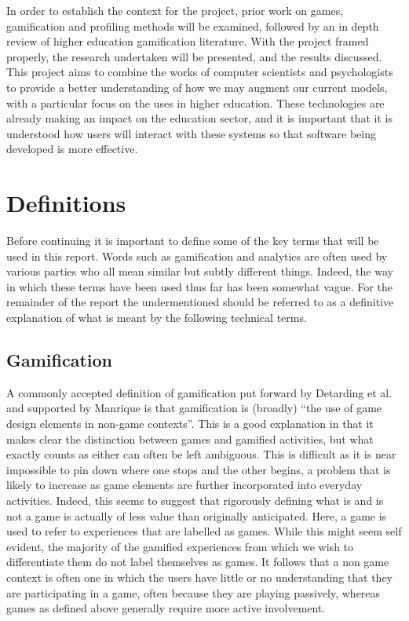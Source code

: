 \documentclass[12pt,a4paper,twoside]{report}
\begin{document}
In order to establish the context for the project, prior work on games, gamification and profiling methods will be examined, followed by an in depth review of higher education gamification literature. With the project framed properly, the research undertaken will be presented, and the results discussed. This project aims to combine the works of computer scientists and psychologists to provide a better understanding of how we may augment our current models, with a particular focus on the uses in higher education. These technologies are already making an impact on the education sector, and it is important that it is understood how users will interact with these systems so that software being developed is more effective.

\chapter{Definitions}
\label{sec:define}
Before continuing it is important to define some of the key terms that will be used in this report. Words such as gamification and analytics are often used by various parties who all mean similar but subtly different things. Indeed, the way in which these terms have been used thus far has been somewhat vague. For the remainder of the report the undermentioned should be referred to as a definitive explanation of what is meant by the following technical terms.

\section{Gamification}
A commonly accepted definition of gamification put forward by Detarding et al. \cite{deterding2011game} and supported by Manrique \cite{iversitymooc} is that gamification is (broadly) ``the use of game design elements in non-game contexts''. This is a good explanation in that it makes clear the distinction between games and gamified activities, but what exactly counts as either can often be left ambiguous. This is difficult as it is near impossible to pin down where one stops and the other begins, a problem that is likely to increase as game elements are further incorporated into everyday activities. Indeed, this seems to suggest that rigorously defining what is and is not a game is actually of less value than originally anticipated. Here, a game is used to refer to experiences that are labelled as games. While this might seem self evident, the majority of the gamified experiences from which we wish to differentiate them do not label themselves as games. It follows that a non game context is often one in which the users have little or no understanding that they are participating in a game, often because they are playing passively, whereas games as defined above generally require more active involvement.
\end{document}
